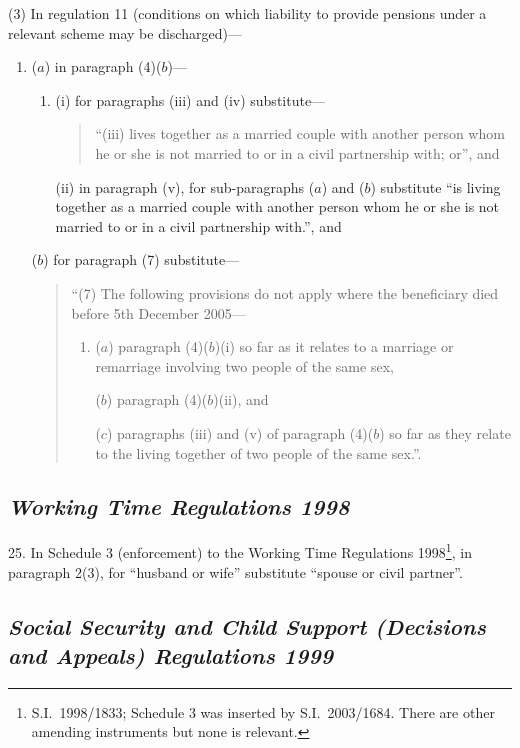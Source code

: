 \documentclass[12pt,a4paper]{article}
\begin{document}
(3) In regulation 11 (conditions on which liability to provide pensions under a relevant scheme may be discharged)—
\begin{enumerate}\item[]
($a$) in paragraph (4)($b$)—
\begin{enumerate}\item[]
(i) for paragraphs (iii)  and (iv) substitute—
\begin{quotation}
“(iii) lives together as a married couple with another person whom he or she is not married to or in a civil partnership with; or”, and
\end{quotation}

(ii) in paragraph (v), for sub-paragraphs ($a$)  and ($b$)  substitute “is living together as a married couple with another person whom he or she is not married to or in a civil partnership with.”, and
\end{enumerate}

($b$) for paragraph (7) substitute—
\begin{quotation}
“(7) The following provisions do not apply where the beneficiary died before 5th December 2005—
\begin{enumerate}\item[]
($a$) paragraph (4)($b$)(i)  so far as it relates to a marriage or remarriage involving two people of the same sex,

($b$) paragraph (4)($b$)(ii), and

($c$) paragraphs (iii)  and (v) of paragraph (4)($b$)  so far as they relate to the living together of two people of the same sex.”.
\end{enumerate}
\end{quotation}
\end{enumerate}

\subsection*{\itshape Working Time Regulations 1998}

25.  In Schedule 3 (enforcement) to the Working Time Regulations 1998\footnote{S.I.~1998/1833; Schedule 3 was inserted by S.I.~2003/1684. There are other amending instruments but none is relevant.}, in paragraph 2(3), for “husband or wife” substitute “spouse or civil partner”.

\subsection*{\itshape Social Security and Child Support (Decisions and Appeals) Regulations 1999}
\end{document}
